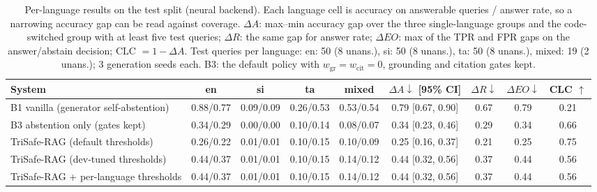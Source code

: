 \begin{table}[t]
  \caption{Per-language results on the test split (neural backend). Each language cell is accuracy on answerable queries / answer rate, so a narrowing accuracy gap can be read against coverage. $\Delta A$: max--min accuracy gap over the three single-language groups and the code-switched group with at least five test queries; $\Delta R$: the same gap for answer rate; $\Delta EO$: max of the TPR and FPR gaps on the answer/abstain decision; CLC $= 1-\Delta A$. Test queries per language: en: 50 (8 unans.), si: 50 (8 unans.), ta: 50 (8 unans.), mixed: 19 (2 unans.); 3 generation seeds each. B3: the default policy with $w_{\mathrm{gr}}{=}w_{\mathrm{cit}}{=}0$, grounding and citation gates kept.}
  \label{tab:fair-neural}
  \footnotesize
  \setlength{\tabcolsep}{3.5pt}
  \begin{tabular}{lcccccccc}
    \toprule
    System & en & si & ta & mixed & $\Delta A \downarrow$ [95\% CI] & $\Delta R \downarrow$ & $\Delta EO \downarrow$ & CLC $\uparrow$ \\
    \midrule
    B1 vanilla (generator self-abstention) & 0.88/0.77 & 0.09/0.09 & 0.26/0.53 & 0.53/0.54 & 0.79 [0.67, 0.90] & 0.67 & 0.79 & 0.21 \\
    B3 abstention only (gates kept) & 0.34/0.29 & 0.00/0.00 & 0.10/0.14 & 0.08/0.07 & 0.34 [0.23, 0.46] & 0.29 & 0.34 & 0.66 \\
    TriSafe-RAG (default thresholds) & 0.26/0.22 & 0.01/0.01 & 0.10/0.15 & 0.10/0.09 & 0.25 [0.16, 0.37] & 0.21 & 0.25 & 0.75 \\
    TriSafe-RAG (dev-tuned thresholds) & 0.44/0.37 & 0.01/0.01 & 0.10/0.15 & 0.14/0.12 & 0.44 [0.32, 0.56] & 0.37 & 0.44 & 0.56 \\
    TriSafe-RAG + per-language thresholds & 0.44/0.37 & 0.01/0.01 & 0.10/0.15 & 0.14/0.12 & 0.44 [0.32, 0.56] & 0.37 & 0.44 & 0.56 \\
    \bottomrule
  \end{tabular}
\end{table}
